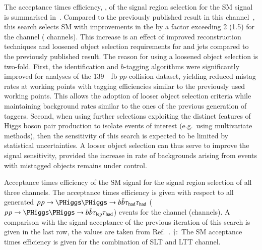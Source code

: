 The acceptance times efficiency, \AccTimesEff, of the signal region
selection for the SM \HH signal is summarised
in~. Compared to the previously
published result in this channel~\cite{HIGG-2016-16-witherratum}, this
search selects SM \HH with improvements in the \AccTimesEff by a
factor exceeding 2 (1.5) for the \hadhad channel (\lephad
channels). This increase is an effect of improved \tauhadvis
reconstruction techniques and loosened object selection requirements
for \tauhadvis and \btagged jets compared to the previously published
result. The reason for using a loosened object selection is
two-fold. First, the \tauhadvis identification and $b$-tagging
algorithms were significantly improved for analyses of the
\SI{139}{\per\femto\barn} $pp$-collision dataset, yielding reduced
mistag rates at working points with tagging efficiencies similar to
the previously used working points. This allows the adoption of looser
object selection criteria while maintaining background rates similar
to the ones of the previous generation of taggers. Second, when using
further selections exploiting the distinct features of Higgs boson
pair production to isolate events of interest (e.g.\ using
multivariate methods), then the sensitivity of this search is expected
to be limited by statistical uncertainties. A looser object selection
can thus serve to improve the signal sensitivity, provided the
increase in rate of backgrounds arising from events with mistagged
objects remains under control.

\begin{table}[htbp]
  \centering

  \caption{Acceptance times efficiency of the SM \HH signal for the
    signal region selection of all three channels. The acceptance
    times efficiency is given with respect to all generated
    $pp \to \HH \to \bbbar\hadhad$ ($pp \to \HH \to \bbbar\lephad$)
    events for the \hadhad channel (\lephad channels). A comparison
    with the signal acceptance of the previous iteration of this
    search is given in the last row, the values are taken from
    Ref.~\cite{HIGG-2016-16-witherratum}. $\dagger$:~The SM \HH
    acceptance times efficiency is given for the combination of
    \lephad SLT and LTT channel.}%
  \label{tab:nonres_acc_times_eff}

  
\end{table}

